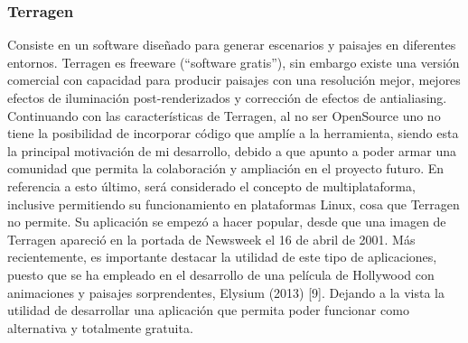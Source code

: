 \documentclass[12pt]{article} %
\begin{document}
\subsubsection{Terragen}
Consiste en un software diseñado para generar escenarios y paisajes en diferentes entornos. Terragen es freeware (“software gratis”), sin embargo existe una versión comercial con capacidad para producir paisajes con una resolución mejor, mejores efectos de iluminación post-renderizados y corrección de efectos de antialiasing.
Continuando con las características de Terragen, al no ser OpenSource uno no tiene la posibilidad de incorporar código que amplíe a la herramienta, siendo esta la principal motivación de mi desarrollo, debido a que apunto a poder armar una comunidad que permita la colaboración y ampliación en el proyecto futuro. En referencia a esto último, será considerado el concepto de multiplataforma, inclusive permitiendo su funcionamiento en plataformas Linux, cosa que Terragen no permite. Su aplicación se empezó a hacer popular, desde que una imagen de Terragen apareció en la portada de Newsweek el 16 de abril de 2001. Más recientemente, es importante destacar la utilidad de este tipo de aplicaciones, puesto que se ha empleado en el desarrollo de una película de Hollywood con animaciones y paisajes sorprendentes, Elysium (2013) [9]. Dejando a la vista la utilidad de desarrollar una aplicación que permita poder funcionar como alternativa y totalmente gratuita.
\end{document}
